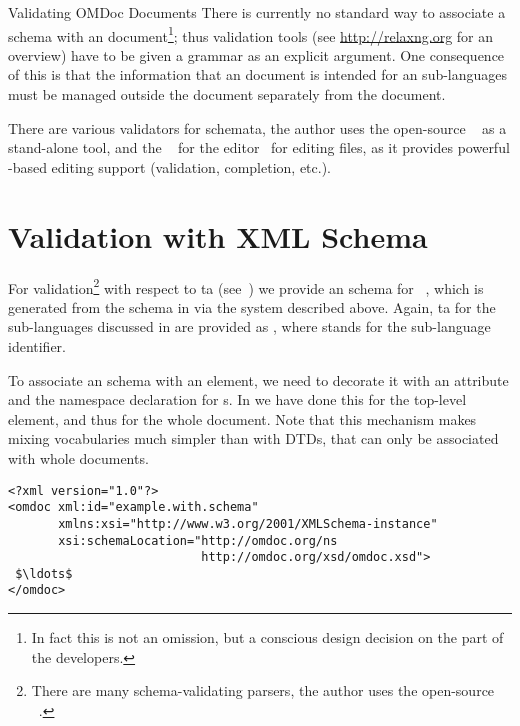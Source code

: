 \begin{module}[id=validating]
\begin{omgroup}[id=validating]{Validating OMDoc Documents}
  There is currently no standard way to associate a {\relaxng} schema with an {\xml}
  document\footnote{In fact this is not an omission, but a conscious design decision on
    the part of the {\relaxng} developers.}; thus validation tools (see
  \url{http://relaxng.org} for an overview) have to be given a grammar as an explicit
  argument. One consequence of this is that the information that an {\omdoc} document is
  intended for an {\omdoc} sub-languages must be managed outside the document separately
  from the document.

  There are various validators for {\relaxng} schemata, the author uses the open-source
  {}~\cite{Veillard:libxml2} as a stand-alone tool, and the
  {}~\cite{nxml-mode:URL} for the {\emacs} editor~\cite{Stallman:em02}
  for editing {\xml} files, as it provides powerful {\relaxng}-based editing support
  (validation, completion, etc.).


\section{Validation with XML Schema}\label{sec:xsd:validation}  
  For validation\footnote{There are many schema-validating {\xml}
    parsers, the author uses the open-source
    {}~\cite{Veillard:libxml2}.} with respect to {\xml}
  {ta} (see~\cite{XML:Schema}) we provide an {\xml} schema for
  {\omdoc}~\cite{OMDocXSD:URL}, which is generated from the {\relaxng} schema in
  {} via the {} system described above. Again,
  {ta} for the sub-languages discussed in {} are
  provided as {}, where {}
  stands for the sub-language identifier.

  To associate an {\xml} schema with an element, we need to decorate it with an
  {} attribute and the namespace declaration
  for {\xml} {s}. In {} we have done this
  for the top-level {} element, and thus for the whole document. Note that
  this mechanism makes mixing {\xml} vocabularies much simpler than with DTDs, that can
  only be associated with whole documents.

\begin{lstlisting}[label=lst:xml-schema,mathescape,
  caption={An \protect{\xml} document with an {\xml} Schema.},
  index={omdoc,xmlns,xsi,schemaLocation}]
<?xml version="1.0"?>
<omdoc xml:id="example.with.schema"
       xmlns:xsi="http://www.w3.org/2001/XMLSchema-instance" 
       xsi:schemaLocation="http://omdoc.org/ns
                           http://omdoc.org/xsd/omdoc.xsd">
 $\ldots$
</omdoc>
\end{lstlisting}
\end{omgroup}
\end{module}

